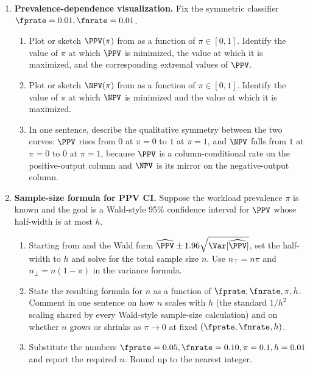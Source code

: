 \begin{enumerate}
\item \exstarstar
\label{ex:ch7-6}
\textbf{Prevalence-dependence visualization.}
Fix the symmetric classifier $\fprate = 0.01, \fnrate = 0.01$.
\begin{enumerate}
  \item[(a)] Plot or sketch $\PPV(\pi)$ from  as a
    function of $\pi \in [0, 1]$. Identify the value of $\pi$ at
    which $\PPV$ is minimized, the value at which it is maximized,
    and the corresponding extremal values of $\PPV$.
  \item[(b)] Plot or sketch $\NPV(\pi)$ from  as a
    function of $\pi \in [0, 1]$. Identify the value of $\pi$ at
    which $\NPV$ is minimized and the value at which it is
    maximized.
  \item[(c)] In one sentence, describe the qualitative symmetry
    between the two curves: $\PPV$ rises from $0$ at $\pi = 0$ to
    $1$ at $\pi = 1$, and $\NPV$ falls from $1$ at $\pi = 0$ to
    $0$ at $\pi = 1$, because $\PPV$ is a column-conditional rate
    on the positive-output column and $\NPV$ is its mirror on the
    negative-output column.
\end{enumerate}

\item \exstarstar
\label{ex:ch7-7}
\textbf{Sample-size formula for PPV CI.}
Suppose the workload prevalence $\pi$ is known and the goal is a
Wald-style 95\% confidence interval for $\PPV$ whose half-width is
at most $h$.
\begin{enumerate}
  \item[(a)] Starting from  and the Wald
    form $\widehat{\PPV} \pm 1.96 \sqrt{\Var[\widehat{\PPV}]}$,
    set the half-width to $h$ and solve for the total sample
    size $n$. Use $n_\top = n \pi$ and $n_\bot = n (1 - \pi)$ in
    the variance formula.
  \item[(b)] State the resulting formula for $n$ as a function of
    $\fprate, \fnrate, \pi, h$. Comment in one sentence on how
    $n$ scales with $h$ (the standard $1/h^2$ scaling shared by
    every Wald-style sample-size calculation) and on whether $n$
    grows or shrinks as $\pi \to 0$ at fixed
    $(\fprate, \fnrate, h)$.
  \item[(c)] Substitute the numbers $\fprate = 0.05, \fnrate =
    0.10, \pi = 0.1, h = 0.01$ and report the required $n$. Round
    up to the nearest integer.
\end{enumerate}


\end{enumerate}
